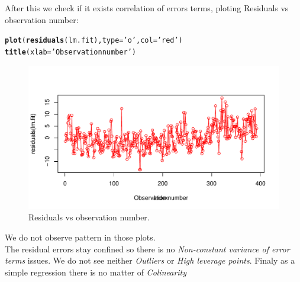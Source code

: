\documentclass[a4paper, 10pt]{scrartcl}\usepackage[]{graphicx}\usepackage[]{color}
\makeatletter
\def\maxwidth{ %
  \ifdim\Gin@nat@width>\linewidth
    \linewidth
  \else
    \Gin@nat@width
  \fi
}
\newcommand{\hlstr}[1]{\textcolor[rgb]{0.192,0.494,0.8}{#1}}%
\newcommand{\hlstd}[1]{\textcolor[rgb]{0.345,0.345,0.345}{#1}}%
\newcommand{\hlkwc}[1]{\textcolor[rgb]{0.333,0.667,0.333}{#1}}%
\newcommand{\hlkwd}[1]{\textcolor[rgb]{0.737,0.353,0.396}{\textbf{#1}}}%
\newenvironment{kframe}{%
 \def\at@end@of@kframe{}%
 \ifinner\ifhmode%
  \def\at@end@of@kframe{\end{minipage}}%
  \begin{minipage}{\columnwidth}%
 \fi\fi%
 \def\FrameCommand##1{\hskip\@totalleftmargin \hskip-\fboxsep
 \colorbox{shadecolor}{##1}\hskip-\fboxsep
     \hskip-\linewidth \hskip-\@totalleftmargin \hskip\columnwidth}%
 \MakeFramed {\advance\hsize-\width
   \@totalleftmargin\z@ \linewidth\hsize
   \@setminipage}}%
 {\par\unskip\endMakeFramed%
 \at@end@of@kframe}
\newenvironment{knitrout}{}{} %
\makeatother
\begin{document}
\begin{itemize}
\begin{knitrout}
\end{knitrout}
		After this we check if it exists correlation of errors
		terms, ploting Residuals vs observation number:
\begin{knitrout}
\color{fgcolor}\begin{kframe}
\begin{alltt}
\hlkwd{plot}\hlstd{(}\hlkwd{residuals}\hlstd{(lm.fit),} \hlkwc{type}\hlstd{=}\hlstr{'o'}\hlstd{,} \hlkwc{col}\hlstd{=}\hlstr{'red'}\hlstd{)}
\hlkwd{title}\hlstd{(}\hlkwc{xlab}\hlstd{=}\hlstr{'Observation number'}\hlstd{)}
\end{alltt}
\end{kframe}\begin{figure}[H]
\includegraphics[width=\maxwidth]{figure/p3b-1} \caption[Residuals vs observation number]{Residuals vs observation number.}\label{fig:p3b}
\end{figure}


\end{knitrout}
We do not observe pattern in those plots.\\The residual errors stay
confined so there is no \emph{Non-constant variance of error terms}
issues. We do not see neither \emph{Outliers} or \emph{High leverage
points}. Finaly as a simple regression there is no matter of \emph{
Colinearity}
\end{itemize}
\end{document}
